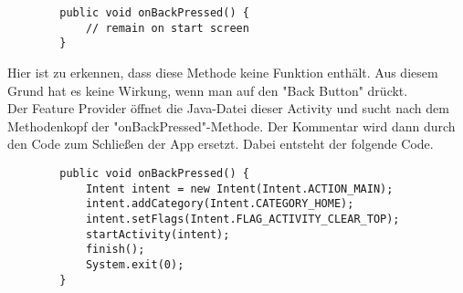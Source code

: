 	\begin{small}
		\begin{verbatim}
		public void onBackPressed() {
		    // remain on start screen
		}
		\end{verbatim}
	\end{small}

	\noindent Hier ist zu erkennen, dass diese Methode keine Funktion enth\"alt. Aus diesem Grund hat es keine Wirkung, wenn man auf den "Back Button" dr\"uckt.\\
	Der Feature Provider \"offnet die Java-Datei dieser Activity und sucht nach dem Methodenkopf der "onBackPressed"-Methode. Der Kommentar wird dann durch den Code zum Schlie\ss{}en der App ersetzt. Dabei entsteht der folgende Code.
	
	\begin{small}
		\begin{verbatim}
		public void onBackPressed() {
		    Intent intent = new Intent(Intent.ACTION_MAIN);
		    intent.addCategory(Intent.CATEGORY_HOME);
		    intent.setFlags(Intent.FLAG_ACTIVITY_CLEAR_TOP);
		    startActivity(intent);
		    finish();
		    System.exit(0);
		}
		\end{verbatim}
	\end{small}

